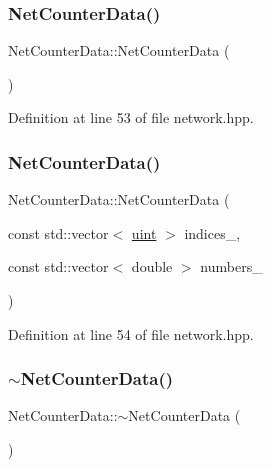 \subsubsection{\texorpdfstring{Net\+Counter\+Data()}{NetCounterData()}\hspace{0.1cm}{\footnotesize\ttfamily [1/2]}}
{\footnotesize\ttfamily Net\+Counter\+Data\+::\+Net\+Counter\+Data (\begin{DoxyParamCaption}{ }\end{DoxyParamCaption})\hspace{0.3cm}{\ttfamily [inline]}}



Definition at line 53 of file network.\+hpp.

\mbox{\label{class_net_counter_data_ac816e1f8892a4d6f500df387309c1b1b}} 
\subsubsection{\texorpdfstring{Net\+Counter\+Data()}{NetCounterData()}\hspace{0.1cm}{\footnotesize\ttfamily [2/2]}}
{\footnotesize\ttfamily Net\+Counter\+Data\+::\+Net\+Counter\+Data (\begin{DoxyParamCaption}\item[{const std\+::vector$<$ \hyperlink{typedefs_8hpp_a91ad9478d81a7aaf2593e8d9c3d06a14}{uint} $>$}]{indices\+\_\+,  }\item[{const std\+::vector$<$ double $>$}]{numbers\+\_\+ }\end{DoxyParamCaption})\hspace{0.3cm}{\ttfamily [inline]}}



Definition at line 54 of file network.\+hpp.

\mbox{\label{class_net_counter_data_a2e88fcc7f0296d791fe9f0facd24489f}} 
\subsubsection{\texorpdfstring{$\sim$\+Net\+Counter\+Data()}{~NetCounterData()}}
{\footnotesize\ttfamily Net\+Counter\+Data\+::$\sim$\+Net\+Counter\+Data (\begin{DoxyParamCaption}{ }\end{DoxyParamCaption})\hspace{0.3cm}{\ttfamily [inline]}}




